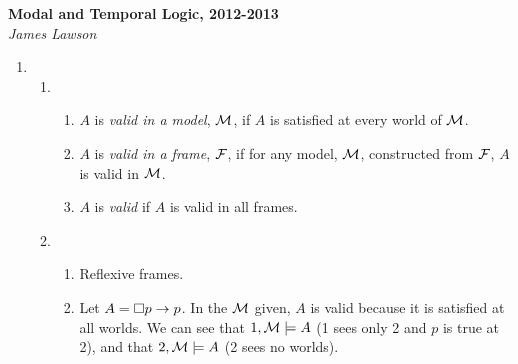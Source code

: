 \documentclass[a4paper, draft, 12pt]{article}
\begin{document}
\textbf{Modal and Temporal Logic, 2012-2013}\\
\textit{James Lawson}

\begin{enumerate} 
\item %
\begin{enumerate}
\item
  \begin{enumerate}
  \item
  $A$ is \textit{valid in a model}, $\mathcal{M}$, if $A$ is satisfied at every world of $\mathcal{M}$.
  \item
  $A$ is \textit{valid in a frame}, $\mathcal{F}$, if for any model, $\mathcal{M}$, constructed from $\mathcal{F}$, $A$ is valid in $\mathcal{M}$.
  \item
  $A$ is \textit{valid} if $A$ is valid in all frames.
  \end{enumerate}
\item 
  \begin{enumerate}
  \item
  Reflexive frames.
  \item
  Let $A = \square p \rightarrow p$.
  In the $\mathcal{M}$ given, $A$ is valid because it is satisfied at all worlds. We can see that $1, \mathcal{M} \models A$ 
  (1 sees only 2 and $p$ is true at 2), and that $2, \mathcal{M} \models A$ (2 sees no worlds). 


\end{enumerate}
\end{enumerate}
\end{enumerate}
\end{document}
